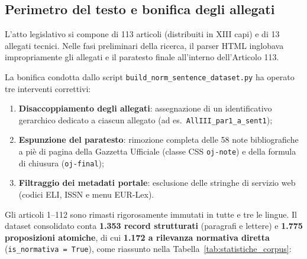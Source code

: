 \documentclass[12pt,a4paper,oneside]{report}
\begin{document}
\subsection{Perimetro del testo e bonifica degli allegati}
L'atto legislativo si compone di 113 articoli (distribuiti in XIII capi) e di 13 allegati tecnici. Nelle fasi preliminari della ricerca, il parser HTML inglobava impropriamente gli allegati e il paratesto finale all'interno dell'Articolo 113. 

La bonifica condotta dallo script \texttt{build\_norm\_sentence\_dataset.py} ha operato tre interventi correttivi:
\begin{enumerate}
    \item \textbf{Disaccoppiamento degli allegati}: assegnazione di un identificativo gerarchico dedicato a ciascun allegato (ad es.\ \texttt{AllIII\_par1\_a\_sent1});
    \item \textbf{Espunzione del paratesto}: rimozione completa delle 58 note bibliografiche a piè di pagina della Gazzetta Ufficiale (classe CSS \texttt{oj-note}) e della formula di chiusura (\texttt{oj-final});
    \item \textbf{Filtraggio dei metadati portale}: esclusione delle stringhe di servizio web (codici ELI, ISSN e menu EUR-Lex).
\end{enumerate}

Gli articoli 1--112 sono rimasti rigorosamente immutati in tutte e tre le lingue. Il dataset consolidato conta \textbf{1.353 record strutturati} (paragrafi e lettere) e \textbf{1.775 proposizioni atomiche}, di cui \textbf{1.172 a rilevanza normativa diretta} (\texttt{is\_normativa = True}), come riassunto nella Tabella~\ref{tab:statistiche_corpus}:

\begin{table}[H]
    \centering
    \small
    \caption[Statistiche del corpus prima e dopo la bonifica]{Statistiche del corpus normativo italiano prima e dopo la bonifica dell'Articolo 113 e degli allegati.}
    \label{tab:statistiche_corpus}
    \renewcommand{\arraystretch}{1.3}
\end{table}
\end{document}
